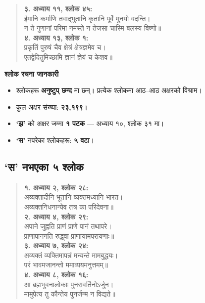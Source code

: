 \documentclass[24pt, a4paper, oneside]{book} %
\begin{document}
{\begin{verse}
\textbf{३. अध्याय ११, श्लोक ४५:} \\
ईमानि कर्माणि तवाद्भुतानि कृतानि पूर्वे मुनयो वदन्ति।\\
न ते गुणानां परिमा नमस्ते न तेजसा चास्मि बलस्य विष्णो॥ \\

\textbf{४. अध्याय १३, श्लोक १:} \\
प्रकृतिं पुरुषं चैव क्षेत्रं क्षेत्रज्ञमेव च।\\
एतद्वेदितुमिच्छामि ज्ञानं ज्ञेयं च केशव॥
\end{verse}

\vspace{0.5em}
{\fontsize{16pt}{20pt}\selectfont\bfseries श्लोक रचना जानकारी\par}
\vspace{0.5em}
\begin{itemize}
    \item श्लोकहरू \textbf{अनुष्टुप् छन्द} मा छन्। प्रत्येक श्लोकमा आठ–आठ अक्षरको विश्राम।
    \item कुल अक्षर संख्या: \textbf{२३,१९९}।
    \item \textbf{‘झ’} को अक्षर जम्मा \textbf{१ पटक} — अध्याय १०, श्लोक ३१ मा।
    \item \textbf{‘स’} नपरेका श्लोकहरू: \textbf{५ वटा}।
\end{itemize}

\vspace{0.5em}
\subsection*{‘स’ नभएका ५ श्लोक}

\begin{verse}
\textbf{१. अध्याय २, श्लोक २८:} \\
अव्यक्तादीनि भूतानि व्यक्तमध्यानि भारत।\\
अव्यक्तनिधनान्येव तत्र का परिदेवना॥ \\

\textbf{२. अध्याय ४, श्लोक २९:} \\
अपाने जुह्वति प्राणं प्राणे पानं तथापरे।\\
प्राणापानगति रुद्ध्वा प्राणायामपरायणाः॥ \\

\textbf{३. अध्याय ७, श्लोक २४:} \\
अव्यक्तं व्यक्तिमापन्नं मन्यन्ते मामबुद्धयः।\\
परं भावमजानन्तो ममाव्ययमनुत्तमम्॥ \\

\textbf{४. अध्याय ८, श्लोक १६:} \\
आ ब्रह्मभुवनालोकाः पुनरावर्तिनोऽर्जुन।\\
मामुपेत्य तु कौन्तेय पुनर्जन्म न विद्यते॥ \\


\end{verse}}
\end{document}
